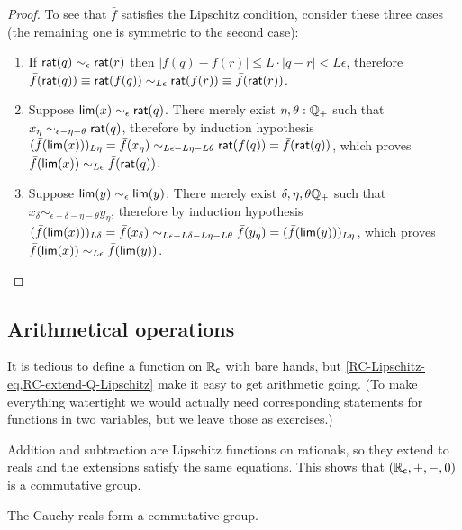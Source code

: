 \begin{proof}
  To see that $\bar{f}$ satisfies the Lipschitz condition, consider these three cases (the
  remaining one is symmetric to the second case):
  \begin{enumerate}
  \item If $\mathsf{rat}(q) \sim_\epsilon \mathsf{rat}(r)$ then $|f(q) - f(r)| \leq L \cdot |q - r| <
    L \epsilon$, therefore $\bar{f}(\mathsf{rat}(q)) \equiv \mathsf{rat}(f(q)) \sim_{L \epsilon}
    \mathsf{rat}(f(r)) \equiv \bar{f}(\mathsf{rat}(r))$.
  \item Suppose $\mathsf{lim}(x) \sim_\epsilon \mathsf{rat}(q)$. There merely exist $\eta, \theta :
    \mathbb{Q}_{+}$ such that $x_\eta \sim_{\epsilon - \eta - \theta} \mathsf{rat}(q)$, therefore by
    induction hypothesis $(\bar{f}(\mathsf{lim}(x)))_{L \eta} = \bar{f}(x_\eta) \sim_{L \epsilon - L
      \eta - L \theta} \mathsf{rat}(f(q)) = \bar{f}(\mathsf{rat}(q))$, which proves
    $\bar{f}(\mathsf{lim}(x)) \sim_{L \epsilon} \bar{f}(\mathsf{rat}(q))$.
  \item Suppose $\mathsf{lim}(y) \sim_\epsilon \mathsf{lim}(y)$. There merely exist $\delta, \eta,
    \theta \mathbb{Q}_{+}$ such that $x_\delta \sim_{\epsilon - \delta - \eta - \theta} y_\eta$,
    therefore by induction hypothesis $(\bar{f}(\mathsf{lim}(x)))_{L \delta} = \bar{f}(x_\delta)
    \sim_{L \epsilon - L \delta - L \eta - L \theta} \bar{f}(y_\eta) =
    (\bar{f}(\mathsf{lim}(y)))_{L \eta}$, which proves $\bar{f}(\mathsf{lim}(x)) \sim_{L \epsilon}
    \bar{f}(\mathsf{lim}(y))$. 
  \end{enumerate}
\end{proof}

\subsection{Arithmetical operations}
\label{sec:arithm-oper}

It is tedious to define a function on $\mathbb{R}_\mathsf{c}$ with bare hands, but
\autoref{RC-Lipschitz-eq,RC-extend-Q-Lipschitz} make it easy to get arithmetic going. (To
make everything watertight we would actually need corresponding statements for functions
in two variables, but we leave those as exercises.)

Addition and subtraction are Lipschitz functions on rationals, so they extend to reals and
the extensions satisfy the same equations. This shows that $(\mathbb{R}_\mathsf{c}, {+}, {-}, 0)$ is a
commutative group.

\begin{thm} \label{RC-commutative-group}
  The Cauchy reals form a commutative group.
\end{thm}

